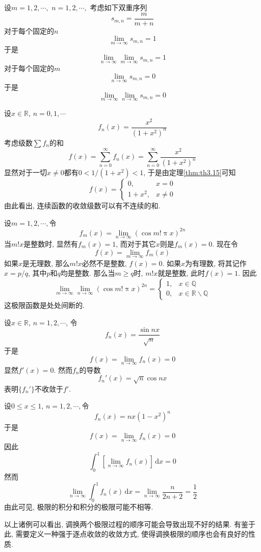 \documentclass[cn,12pt,math=mtpro2,citestyle=gb7714-2015,bibstyle=gb7714-2015,twocol]{elegantbook}
\newcommand{\R}{\mathbb{R}}
\newcommand{\Q}{\mathbb{Q}}
\newcommand{\dx}{\,\text{d}x}
\newcommand{\limn}{\lim_{n\to\infty}}
\begin{document}
\begin{example}
设$m=1,2,\cdots,$ $n=1,2,\cdots,$ 考虑如下双重序列
$$s_{m,n}=\frac{m}{m+n}$$
对于每个固定的$n$
$$\lim_{m\to\infty} s_{m,n}=1$$
于是
$$\limn \lim_{m\to\infty} s_{m,n}=1$$
对于每个固定的$m$
$$\limn  s_{m,n}=0$$
于是
$$\lim_{m\to\infty}\limn  s_{m,n}=0$$
\end{example}
\begin{example}
设$x\in \R$, $n=0,1,\cdots$
$$f_n(x)=\frac{x^2}{(1+x^2)^n}$$
考虑级数$\sum f_n$的和
$$f(x)=\sum_{n=0}^{\infty}f_n(x)=\sum_{n=0}^{\infty}\frac{x^2}{(1+x^2)^n}$$
显然对于一切$x\neq0$都有$0<1/(1+x^2)<1$, 于是由定理\ref{thm:th3.15}可知
$$f(x)=\begin{cases}
0, & x=0 \\
1+x^2, & x\neq0 \end{cases}$$
由此看出, 连续函数的收敛级数可以有不连续的和.
\end{example}
\begin{example}
设$m=1,2,\cdots,$令
$$f_m(x)=\limn (\cos m!\uppi x)^{2n}$$
当$m!x$是整数时, 显然有$f_m(x)=1$, 而对于其它$x$则是$f_m(x)=0$. 现在令
$$f(x)=\lim_{m\to\infty}f_m(x)$$
如果$x$是无理数, 那么$m!x$必然不是整数, $f(x)=0$. 如果$x$为有理数, 将其记作$x=p/q$, 其中$p$和$q$均是整数. 那么当$m\geq q$时, $m!x$就是整数, 此时$f(x)=1$. 因此
$$\lim_{m\to\infty}\limn (\cos m!\uppi x)^{2n}=\begin{cases}
1, & x\in\Q \\
0, & x\in\R\backslash\Q \end{cases}$$
这极限函数是处处间断的.
\end{example}
\begin{example}\label{ex3}
设$x\in\R$, $n=1,2,\cdots$, 令
$$f_n(x)=\frac{\sin nx}{\sqrt{n}}$$
于是
$$f(x)=\limn f_n(x)=0$$
显然$f'(x)=0$. 然而$f_n$的导数
$$f_n'(x)=\sqrt{n}\cos nx$$
表明$\{f_n'\}$不收敛于$f'$.
\end{example}
\begin{example}
设$0\leq x\leq1$, $n=1,2,\cdots,$令
$$f_n(x)=nx(1-x^2)^n$$
于是
$$f(x)=\limn f_n(x)=0$$
因此
$$\int_{0}^{1}\left[\limn f_n(x)\right]\dx=0$$
然而
$$\limn \int_{0}^{1}f_n(x)\dx=\limn \frac{n}{2n+2}=\frac{1}{2}$$
由此可见, 极限的积分和积分的极限可能不相等.
\end{example}
以上诸例可以看出, 调换两个极限过程的顺序可能会导致出现不好的结果. 有鉴于此, 需要定义一种强于逐点收敛的收敛方式, 使得调换极限的顺序也会有良好的性质.
\end{document}
